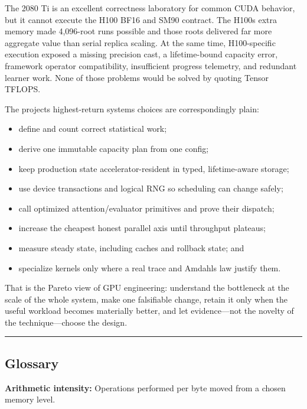 \documentclass[
  10pt,
  letterpaper,
]{article}
\providecommand{\tightlist}{%
  \setlength{\itemsep}{0pt}\setlength{\parskip}{0pt}}
\begin{document}
The 2080 Ti is an excellent correctness laboratory for common CUDA
behavior, but it cannot execute the H100 BF16 and SM90 contract. The
H100\textquotesingle s extra memory made 4,096-root runs possible and
those roots delivered far more aggregate value than serial replica
scaling. At the same time, H100-specific execution exposed a missing
precision cast, a lifetime-bound capacity error, framework operator
compatibility, insufficient progress telemetry, and redundant learner
work. None of those problems would be solved by quoting Tensor TFLOPS.

The project\textquotesingle s highest-return systems choices are
correspondingly plain:

\begin{itemize}
\tightlist
\item
  define and count correct statistical work;
\item
  derive one immutable capacity plan from one config;
\item
  keep production state accelerator-resident in typed, lifetime-aware
  storage;
\item
  use device transactions and logical RNG so scheduling can change
  safely;
\item
  call optimized attention/evaluator primitives and prove their
  dispatch;
\item
  increase the cheapest honest parallel axis until throughput plateaus;
\item
  measure steady state, including caches and rollback state; and
\item
  specialize kernels only where a real trace and
  Amdahl\textquotesingle s law justify them.
\end{itemize}

That is the Pareto view of GPU engineering: understand the bottleneck at
the scale of the whole system, make one falsifiable change, retain it
only when the useful workload becomes materially better, and let
evidence---not the novelty of the technique---choose the design.

\begin{center}\rule{0.5\linewidth}{0.5pt}\end{center}

\subsection{Glossary}\label{glossary}

\textbf{Arithmetic intensity:} Operations performed per byte moved from
a chosen memory level.
\end{document}
